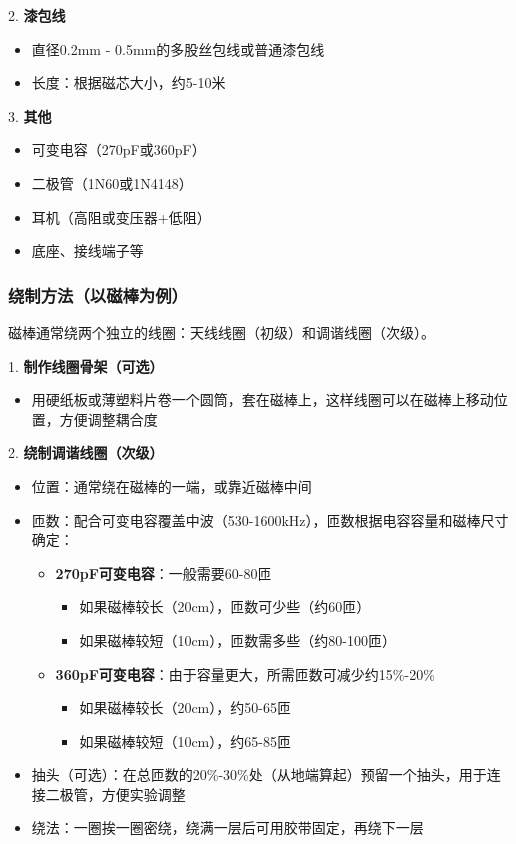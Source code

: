 \documentclass[12pt,UTF8]{ctexbook}
\begin{document}
2. \textbf{漆包线}
\begin{itemize}[leftmargin=3.5em]
	\item 直径0.2mm - 0.5mm的多股丝包线或普通漆包线
	\item 长度：根据磁芯大小，约5-10米
\end{itemize}

3. \textbf{其他}
\begin{itemize}[leftmargin=3.5em]
	\item 可变电容（270pF或360pF）
	\item 二极管（1N60或1N4148）
	\item 耳机（高阻或变压器+低阻）
	\item 底座、接线端子等
\end{itemize}

\subsubsection{绕制方法（以磁棒为例）}

磁棒通常绕两个独立的线圈：天线线圈（初级）和调谐线圈（次级）。

1. \textbf{制作线圈骨架（可选）}
\begin{itemize}[leftmargin=3.5em]
	\item 用硬纸板或薄塑料片卷一个圆筒，套在磁棒上，这样线圈可以在磁棒上移动位置，方便调整耦合度
\end{itemize}

2. \textbf{绕制调谐线圈（次级）}
\begin{itemize}[leftmargin=3.5em]
	\item 位置：通常绕在磁棒的一端，或靠近磁棒中间
	\item 匝数：配合可变电容覆盖中波（530-1600kHz），匝数根据电容容量和磁棒尺寸确定：
	\begin{itemize}[leftmargin=3.5em]
		\item \textbf{270pF可变电容}：一般需要60-80匝
		\begin{itemize}[leftmargin=3.5em]
			\item 如果磁棒较长（20cm），匝数可少些（约60匝）
			\item 如果磁棒较短（10cm），匝数需多些（约80-100匝）
		\end{itemize}
		\item \textbf{360pF可变电容}：由于容量更大，所需匝数可减少约15\%-20\%
		\begin{itemize}[leftmargin=3.5em]
			\item 如果磁棒较长（20cm），约50-65匝
			\item 如果磁棒较短（10cm），约65-85匝
		\end{itemize}
	\end{itemize}
	\item 抽头（可选）：在总匝数的20\%-30\%处（从地端算起）预留一个抽头，用于连接二极管，方便实验调整
	\item 绕法：一圈挨一圈密绕，绕满一层后可用胶带固定，再绕下一层
\end{itemize}
\end{document}
